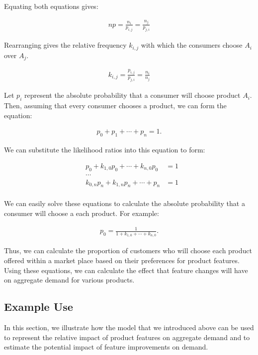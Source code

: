 \documentclass[]{article}
\begin{document}
Equating both equations gives:

\begin{align*}
np = \frac{n_i}{p_{i,j}} = \frac{n_j}{p_{j,i}}
\end{align*}

Rearranging gives the relative frequency \(k_{i,j}\) with which the
consumers choose \(A_i\) over \(A_j\).

\begin{align*}
k_{i,j} = \frac{p_{i,j}}{p_{j,i}} = \frac{n_i}{n_j}
\end{align*}

Let \(p_i\) represent the absolute probability that a consumer will
choose product \(A_i\). Then, assuming that every consumer chooses a
product, we can form the equation:

\begin{align*}
p_0 + p_1 + \cdots + p_n = 1.
\end{align*}

We can substitute the likelihood ratios into this equation to form:

\begin{align*}
& p_0 + k_{1,0} p_0 + \cdots + k_{n,0} p_0 &= 1\\
& \cdots\\
& k_{0,n} p_n + k_{1,n} p_n + \cdots + p_n &= 1\\
\end{align*}

We can easily solve these equations to calculate the absolute
probability that a consumer will choose a each product. For example:

\begin{align*}
p_0 = \frac{1}{1 + k_{1,0} + \cdots + k_{n,0}}.
\end{align*}

Thus, we can calculate the proportion of customers who will choose each
product offered within a market place based on their preferences for
product features. Using these equations, we can calculate the effect
that feature changes will have on aggregate demand for various products.

\hypertarget{example-use}{%
\subsection{Example Use}\label{example-use}}

In this section, we illustrate how the model that we introduced above
can be used to represent the relative impact of product features on
aggregate demand and to estimate the potential impact of feature
improvements on demand.
\end{document}
